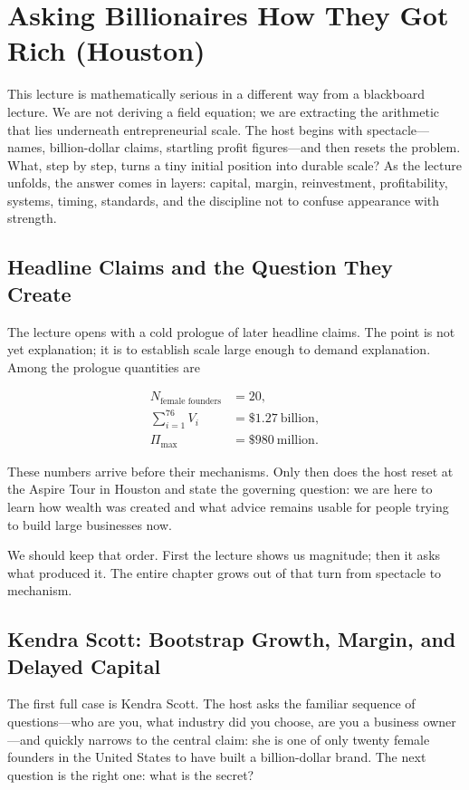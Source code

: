 \chapter{Asking Billionaires How They Got Rich (Houston)}

This lecture is mathematically serious in a different way from a blackboard lecture. We are not deriving a field equation; we are extracting the arithmetic that lies underneath entrepreneurial scale. The host begins with spectacle---names, billion-dollar claims, startling profit figures---and then resets the problem. What, step by step, turns a tiny initial position into durable scale? As the lecture unfolds, the answer comes in layers: capital, margin, reinvestment, profitability, systems, timing, standards, and the discipline not to confuse appearance with strength.

\section{Headline Claims and the Question They Create}

The lecture opens with a cold prologue of later headline claims. The point is not yet explanation; it is to establish scale large enough to demand explanation. Among the prologue quantities are

\begin{align}
N_{\text{female founders}} &= 20,\\
\sum_{i=1}^{76} V_i &= \$1.27\ \text{billion},\\
\Pi_{\max} &= \$980\ \text{million}.
\end{align}

These numbers arrive before their mechanisms. Only then does the host reset at the Aspire Tour in Houston and state the governing question: we are here to learn how wealth was created and what advice remains usable for people trying to build large businesses now.

We should keep that order. First the lecture shows us magnitude; then it asks what produced it. The entire chapter grows out of that turn from spectacle to mechanism.

\section{Kendra Scott: Bootstrap Growth, Margin, and Delayed Capital}

The first full case is Kendra Scott. The host asks the familiar sequence of questions---who are you, what industry did you choose, are you a business owner---and quickly narrows to the central claim: she is one of only twenty female founders in the United States to have built a billion-dollar brand. The next question is the right one: what is the secret?

